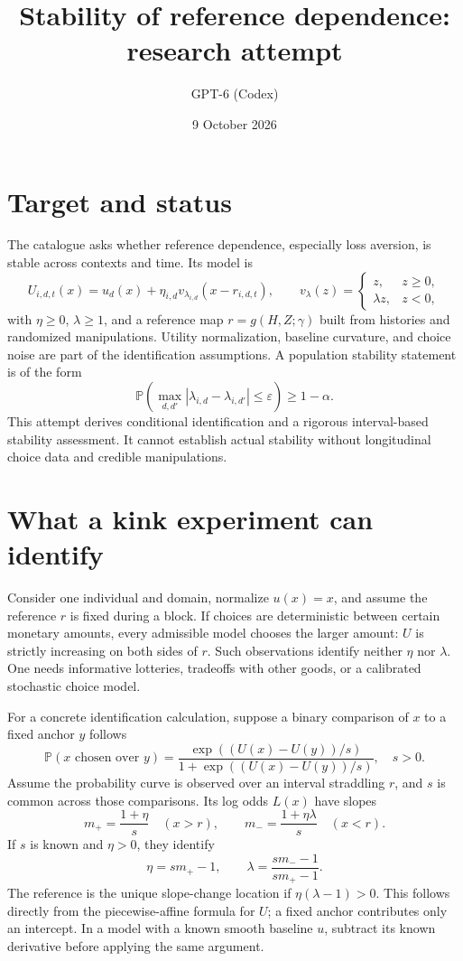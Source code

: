 \documentclass[11pt]{article}
\title{Stability of reference dependence: research attempt}
\author{GPT-6 (Codex)}
\date{9 October 2026}
\newcommand{\Prb}{\mathbb P}
\begin{document}
\maketitle

\section*{Target and status}
The catalogue asks whether reference dependence, especially loss aversion, is stable across contexts and time. Its model is
\[
 U_{i,d,t}(x)=u_d(x)+\eta_{i,d}v_{\lambda_{i,d}}(x-r_{i,d,t}),
 \qquad
 v_\lambda(z)=\begin{cases}z,&z\geq0,\\ \lambda z,&z<0,\end{cases}
\]
with $\eta\geq0$, $\lambda\geq1$, and a reference map $r=g(H,Z;\gamma)$ built from histories and randomized manipulations. Utility normalization, baseline curvature, and choice noise are part of the identification assumptions. A population stability statement is of the form
\[
 \Prb\left(\max_{d,d'}|\lambda_{i,d}-\lambda_{i,d'}|\leq\varepsilon\right)
 \geq1-\alpha.
\]
This attempt derives conditional identification and a rigorous interval-based stability assessment. It cannot establish actual stability without longitudinal choice data and credible manipulations.

\section*{What a kink experiment can identify}
Consider one individual and domain, normalize $u(x)=x$, and assume the reference $r$ is fixed during a block. If choices are deterministic between certain monetary amounts, every admissible model chooses the larger amount: $U$ is strictly increasing on both sides of $r$. Such observations identify neither $\eta$ nor $\lambda$. One needs informative lotteries, tradeoffs with other goods, or a calibrated stochastic choice model.

For a concrete identification calculation, suppose a binary comparison of $x$ to a fixed anchor $y$ follows
\[
 \Prb(x\text{ chosen over }y)
 =\frac{\exp((U(x)-U(y))/s)}{1+\exp((U(x)-U(y))/s)},\quad s>0. \tag{1}
\]
Assume the probability curve is observed over an interval straddling $r$, and $s$ is common across those comparisons. Its log odds $L(x)$ have slopes
\[
 m_+=\frac{1+\eta}{s}\quad(x>r),\qquad
 m_-=\frac{1+\eta\lambda}{s}\quad(x<r).                       \tag{2}
\]
If $s$ is known and $\eta>0$, they identify
\[
 \eta=s m_+-1,\qquad
 \lambda=\frac{s m_--1}{s m_+-1}.                            \tag{3}
\]
The reference is the unique slope-change location if $\eta(\lambda-1)>0$. This follows directly from the piecewise-affine formula for $U$; a fixed anchor contributes only an intercept. In a model with a known smooth baseline $u$, subtract its known derivative before applying the same argument.
\end{document}
